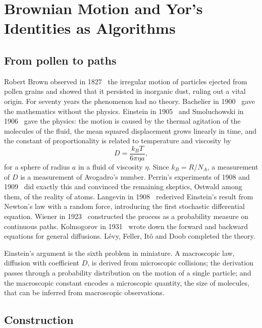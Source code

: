 \chapter{Brownian Motion and Yor's Identities as Algorithms}
\label{ch:brownian}

\section{From pollen to paths}

Robert Brown observed in 1827~\cite{brown1828} the irregular motion of particles ejected from pollen grains and showed that it persisted in inorganic dust, ruling out a vital origin. For seventy years the phenomenon had no theory. Bachelier in 1900~\cite{bachelier1900} gave the mathematics without the physics. Einstein in 1905~\cite{einstein1905} and Smoluchowski in 1906~\cite{smoluchowski1906} gave the physics: the motion is caused by the thermal agitation of the molecules of the fluid, the mean squared displacement grows linearly in time, and the constant of proportionality is related to temperature and viscosity by
\begin{equation}
D = \frac{k_B T}{6\pi\eta a},
\label{eq:einstein_relation}
\end{equation}
for a sphere of radius $a$ in a fluid of viscosity $\eta$. Since $k_B = R/N_A$, a measurement of $D$ is a measurement of Avogadro's number. Perrin's experiments of 1908 and 1909~\cite{perrin1908,perrin1909} did exactly this and convinced the remaining skeptics, Ostwald among them, of the reality of atoms. Langevin in 1908~\cite{langevin1908} rederived Einstein's result from Newton's law with a random force, introducing the first stochastic differential equation. Wiener in 1923~\cite{wiener1923} constructed the process as a probability measure on continuous paths. Kolmogorov in 1931~\cite{kolmogorov1931} wrote down the forward and backward equations for general diffusions. L\'evy, Feller, It\^o and Doob completed the theory.

Einstein's argument is the sixth problem in miniature. A macroscopic law, diffusion with coefficient $D$, is derived from microscopic collisions; the derivation passes through a probability distribution on the motion of a single particle; and the macroscopic constant encodes a microscopic quantity, the size of molecules, that can be inferred from macroscopic observations.

\section{Construction}

